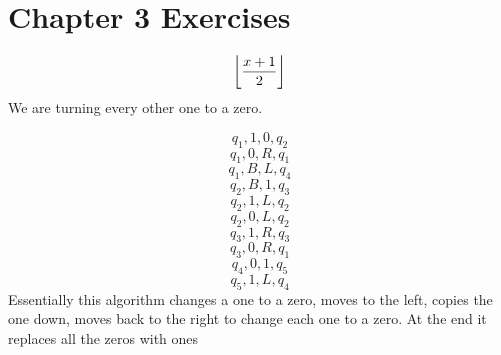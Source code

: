 
\section{Chapter 3 Exercises}

\begin{exe}[4.6.1]
\[\floor*{\frac{x+1}{2}}\]
We are turning every other one to a zero.
\end{exe}
\begin{exe}[4.6.2]
\[q_1, 1, 0, q_2\]
\[q_1, 0, R, q_1\]
\[q_1, B, L, q_4\]
\[q_2, B, 1, q_3\]
\[q_2, 1, L, q_2\]
\[q_2, 0, L, q_2\]
\[q_3, 1, R, q_3\]
\[q_3, 0, R, q_1\]
\[q_4, 0, 1, q_5\]
\[q_5, 1, L, q_4\]
Essentially this algorithm changes a one to a zero, moves to the left, copies the one down, 
moves back to the right to change each one to a zero. At the end it replaces all the 
zeros with ones
\end{exe}
    